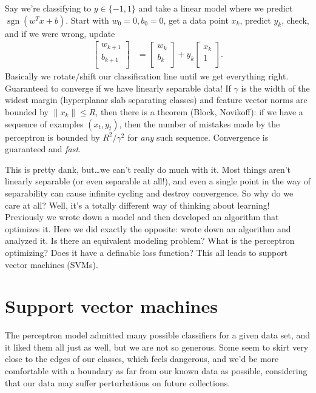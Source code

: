 \documentclass[11pt,letterpaper]{article}
\DeclareMathOperator{\sgn}{sgn}
\theoremstyle{definition}
\theoremstyle{plain}
\numberwithin{equation}{section}
\numberwithin{figure}{section}
\begin{document}
Say we're classifying to $y \in \{-1,1\}$ and take a linear model where we predict $\sgn(w^T x + b)$. Start with $w_0 = 0, b_0 = 0$, get a data point $x_k$, predict $y_k$, check, and if we were wrong, update
%
\begin{align}
	\begin{bmatrix}w_{k+1}\\b_{k+1}\\\end{bmatrix} &= \begin{bmatrix}w_k\\b_k\\\end{bmatrix} + y_k \begin{bmatrix}x_k\\1\\\end{bmatrix}.
\end{align}
%
Basically we rotate/shift our classification line until we get everything right. Guaranteed to converge if we have linearly separable data! If $\gamma$ is the width of the widest margin (hyperplanar slab separating classes) and feature vector norms are bounded by $\|x_k\| \leq R$, then there is a theorem (Block, Novikoff): if we have a sequence of examples $(x_t,y_t)$, then the number of mistakes made by the perceptron is bounded by $R^2 / \gamma^2$ for \emph{any} such sequence. Convergence is guaranteed and \emph{fast}.

This is pretty dank, but\ldots we can't really do much with it. Most things aren't linearly separable (or even separable at all!), and even a single point in the way of separability can cause infinite cycling and destroy convergence. So why do we care at all? Well, it's a totally different way of thinking about learning! Previously we wrote down a model and then developed an algorithm that optimizes it. Here we did exactly the opposite: wrote down an algorithm and analyzed it. Is there an equivalent modeling problem? What is the perceptron optimizing? Does it have a definable loss function? This all leads to support vector machines (SVMs).

















\section{Support vector machines}
The perceptron model admitted many possible classifiers for a given data set, and it liked them all just as well, but we are not so generous. Some seem to skirt very close to the edges of our classes, which feels dangerous, and we'd be more comfortable with a boundary as far from our known data as possible, considering that our data may suffer perturbations on future collections.
\end{document}
